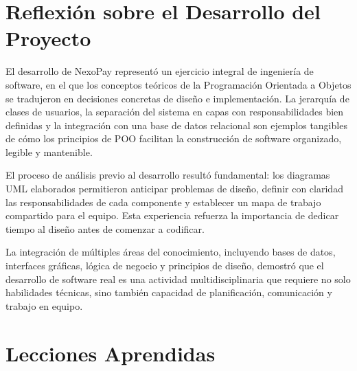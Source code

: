 \documentclass[12pt,a4paper]{report}
\begin{document}
\section{Reflexión sobre el Desarrollo del Proyecto}

El desarrollo de NexoPay representó un ejercicio integral de ingeniería de software, en el que los conceptos teóricos de la Programación Orientada a Objetos se tradujeron en decisiones concretas de diseño e implementación. La jerarquía de clases de usuarios, la separación del sistema en capas con responsabilidades bien definidas y la integración con una base de datos relacional son ejemplos tangibles de cómo los principios de POO facilitan la construcción de software organizado, legible y mantenible.

El proceso de análisis previo al desarrollo resultó fundamental: los diagramas UML elaborados permitieron anticipar problemas de diseño, definir con claridad las responsabilidades de cada componente y establecer un mapa de trabajo compartido para el equipo. Esta experiencia refuerza la importancia de dedicar tiempo al diseño antes de comenzar a codificar.

La integración de múltiples áreas del conocimiento, incluyendo bases de datos, interfaces gráficas, lógica de negocio y principios de diseño, demostró que el desarrollo de software real es una actividad multidisciplinaria que requiere no solo habilidades técnicas, sino también capacidad de planificación, comunicación y trabajo en equipo.

\section{Lecciones Aprendidas}
\end{document}
